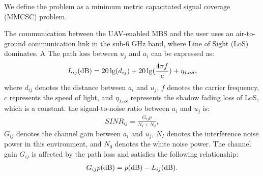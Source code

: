 \documentclass[journal]{IEEEtran}
\begin{document}
We define the problem as a minimum metric capacitated signal coverage (MMCSC) problem.



% 




The communication between the UAV-enabled MBS and the user uses an air-to-ground communication link in the sub-6 GHz band, where Line of Sight (LoS) dominates. A The path loss between $u_j$ and $a_i$ can be expressed as:
\begin{eqnarray}
	\label{eq1}
	{L_{ij}}({\rm{dB}}) = 20\lg ({d_{ij}}) + 20\lg (\frac{{4\pi f}}{c}) + {\eta _{LoS}},
\end{eqnarray}
where $d_{ij}$ denotes the distance between $a_i$ and $u_j$, $f$ denotes the carrier frequency, $c$ represents the speed of light, and $\eta _{LoS}$ represents the shadow fading loss of LoS, which is a constant. the signal-to-noise ratio between $a_i$ and $u_j$ is:
\begin{eqnarray}
	\label{eq2}
	SINR_{ij} = \frac{{{G_{ij}}{p}}}{{{N_I} + {N_0}}},
\end{eqnarray}
$G_{ij}$ denotes the channel gain between $a_i$ and $u_j$, $N_I$ denotes the interference noise power in this environment, and $N_0$ denotes the white noise power. The channel gain $G_{ij}$ is affected by the path loss and satisfies the following relationship:
\begin{eqnarray}
	\label{eq3}
	{G_{ij}}{p}({\rm{dB}}) = {p}({\rm{dB}}) - {L_{ij}}({\rm{dB}}).
\end{eqnarray}
\end{document}
